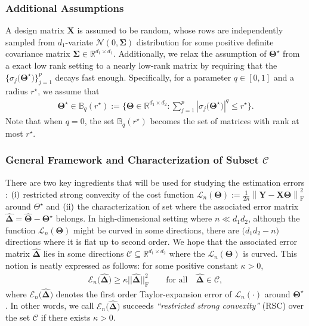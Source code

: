\documentclass[12pt]{article}
\newcommand{\RN}[1]{%
  \textup{\uppercase\expandafter{\romannumeral#1}}%
}
\begin{document}
\subsubsection{Additional Assumptions}
A design matrix $\boldsymbol{X}$ is assumed to be random, whose rows are independently sampled from $d_{1}$-variate $\mathcal{N}(0,\boldsymbol{\Sigma})$ distribution for some positive definite covariance matrix $\boldsymbol{\Sigma}\in\mathbb{R}^{d_{1} \times d_{1}}$.
Additionally, we relax the assumption of $\boldsymbol{\Theta}^{\star}$ from a exact low rank setting to a nearly low-rank matrix by requiring that the $\{\sigma_{j}\big(\boldsymbol{\Theta}^{\star}\big)\}_{j=1}^{p}$ decays fast enough.
Specifically, for a parameter $q\in[0,1]$ and a radius $r^{\star}$, we assume that
\begin{align*}
    \boldsymbol{\Theta}^{\star} \in \mathbb{B}_{q}(r^{\star})
    := \bigg\{ \boldsymbol{\Theta}\in\mathbb{R}^{d_{1} \times d_{2}} : 
    \sum_{j=1}^{p} \left| \sigma_{j}\big(\boldsymbol{\Theta}^{\star} \big) \right|^{q} \leq r^{\star}
    \bigg\}.
\end{align*}
Note that when $q=0$, the set $\mathbb{B}_{q}(r^{\star})$ becomes the set of matrices with rank at most $r^{\star}$. 

\subsubsection{General Framework and Characterization of Subset $\mathcal{C}$}
There are two key ingredients that will be used for studying the estimation errors : $(\RN{1})$ restricted strong convexity of the cost function $\mathcal{L}_{n}(\boldsymbol{\Theta}):= \frac{1}{2n} \left\| \boldsymbol{Y}-\boldsymbol{X}\boldsymbol{\Theta} \right\|_{\text{F}}^{2}$ around $\Theta^\star$ and
$(\RN{2})$ the characterization of set where the associated error matrix $\boldsymbol{\widehat{\Delta}}=\widehat{\boldsymbol{\Theta}}-\boldsymbol{\Theta^{\star}}$ belongs. 
In high-dimensional setting where $n \ll d_{1}d_{2}$, although the function $\mathcal{L}_{n}(\boldsymbol{\Theta})$ might be curved in some directions, there are $\big(d_{1}d_{2}-n\big)$ directions where it is flat up to second order. 
We hope that the associated error matrix $\boldsymbol{\widehat{\Delta}}$ 
lies in some directions $\mathcal{C}\subseteq \mathbb{R}^{d_{1}\times d_{2}}$ where the $\mathcal{L}_{n}(\boldsymbol{\Theta})$ is curved. 
This notion is neatly expressed as follows: for some positive constant $\kappa>0$,
\begin{align} \label{RSC}
    \mathcal{E}_{n}\big(\boldsymbol{\widehat{\Delta}})\geq \kappa || \boldsymbol{\widehat{\Delta}} ||_{\text{F}}^{2} \qquad \text{for all} \quad \boldsymbol{\widehat{\Delta}}\in\mathcal{C},
\end{align}
where $\mathcal{E}_{n}\big(\boldsymbol{\widehat{\Delta}})$ denotes the first order Taylor-expansion error of $\mathcal{L}_{n}(\cdot)$ around $\boldsymbol{\Theta}^\star$.
In other words, we call $\mathcal{E}_{n}\big(\boldsymbol{\widehat{\Delta}})$ succeeds \textit{``restricted strong convexity''} (RSC) over the set $\mathcal{C}$ if there exists $\kappa>0$. 
\end{document}
